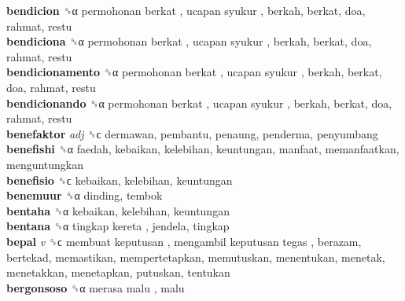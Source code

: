 \textbf{bendicion} ␝α   permohonan berkat ,  ucapan syukur , berkah, berkat, doa, rahmat, restu  \\
\textbf{bendiciona} ␝α   permohonan berkat ,  ucapan syukur , berkah, berkat, doa, rahmat, restu  \\
\textbf{bendicionamento} ␝α   permohonan berkat ,  ucapan syukur , berkah, berkat, doa, rahmat, restu  \\
\textbf{bendicionando} ␝α   permohonan berkat ,  ucapan syukur , berkah, berkat, doa, rahmat, restu  \\
\textbf{benefaktor} \emph{adj}  ␝ϲ  dermawan, pembantu, penaung, penderma, penyumbang  \\
\textbf{benefishi} ␝α  faedah, kebaikan, kelebihan, keuntungan, manfaat, memanfaatkan, menguntungkan  \\
\textbf{benefisio} ␝ϲ  kebaikan, kelebihan, keuntungan  \\
\textbf{benemuur} ␝α  dinding, tembok  \\
\textbf{bentaha} ␝α  kebaikan, kelebihan, keuntungan  \\
\textbf{bentana} ␝α   tingkap kereta , jendela, tingkap  \\
\textbf{bepal} \emph{v}  ␝ϲ   membuat keputusan ,  mengambil keputusan tegas , berazam, bertekad, memastikan, mempertetapkan, memutuskan, menentukan, menetak, menetakkan, menetapkan, putuskan, tentukan  \\
\textbf{bergonsoso} ␝α   merasa malu , malu  \\
